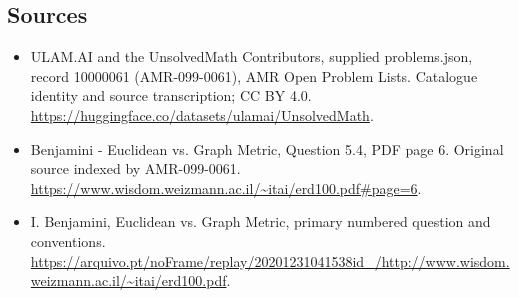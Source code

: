 \documentclass[11pt,a4paper]{article}
\begin{document}
\subsection{Sources}
\begin{itemize}
\item[S1] ULAM.AI and the UnsolvedMath Contributors, supplied problems.json, record 10000061 (AMR-099-0061), AMR Open Problem Lists. Catalogue identity and source transcription; CC BY 4.0.
\url{https://huggingface.co/datasets/ulamai/UnsolvedMath}.
\item[S2] Benjamini - Euclidean vs. Graph Metric, Question 5.4, PDF page 6. Original source indexed by AMR-099-0061.
\url{https://www.wisdom.weizmann.ac.il/~itai/erd100.pdf#page=6}.
\item[S3] I. Benjamini, Euclidean vs. Graph Metric, primary numbered question and conventions.
\url{https://arquivo.pt/noFrame/replay/20201231041538id_/http://www.wisdom.weizmann.ac.il/~itai/erd100.pdf}.
\end{itemize}
\end{document}
